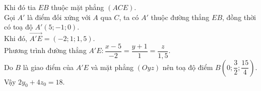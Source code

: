 \begin{ex}
{\begin{itemchoice}
			Khi đó tia $EB$  thuộc mặt phẳng $(ACE)$.\\
			Gọi $A'$ là điểm đối xứng với $A$ qua  $C$, ta có $A'$ thuộc đường thẳng $EB$, đồng thời có toạ độ $A'(5;-1;0)$.\\
			Khi  đó, $\overrightarrow{A'E}=(-2;1;1{,}5)$.\\
			 Phương trình đường thẳng $A'E\colon \dfrac{x-5}{-2}=\dfrac{y+1}{1}=\dfrac{z}{1{,}5}$.\\
			Do $B$ là  giao điểm của $A'E$ và mặt phẳng $(Oyz)$ nên toạ độ điểm $B\left(0;\dfrac{3}{2};\dfrac{15}{4}\right)$.\\
			Vậy  $2y_0+4z_0=18$.
		\end{itemchoice}
	 }
\end{ex}

